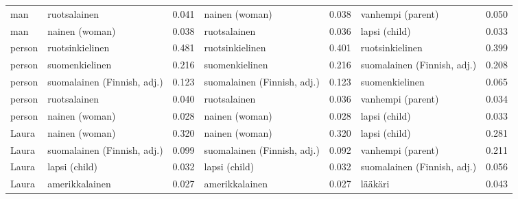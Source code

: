 \begin{longtable}{llrlrlr}
   man &                ruotsalainen &                            0.041 &              nainen (woman) &                                 0.038 &           vanhempi (parent) &                           0.050 \\
   man &              nainen (woman) &                            0.038 &                ruotsalainen &                                 0.036 &               lapsi (child) &                           0.033 \\
person &             ruotsinkielinen &                            0.481 &             ruotsinkielinen &                                 0.401 &             ruotsinkielinen &                           0.399 \\
person &              suomenkielinen &                            0.216 &              suomenkielinen &                                 0.216 & suomalainen (Finnish, adj.) &                           0.208 \\
person & suomalainen (Finnish, adj.) &                            0.123 & suomalainen (Finnish, adj.) &                                 0.123 &              suomenkielinen &                           0.065 \\
person &                ruotsalainen &                            0.040 &                ruotsalainen &                                 0.036 &           vanhempi (parent) &                           0.034 \\
person &              nainen (woman) &                            0.028 &              nainen (woman) &                                 0.028 &               lapsi (child) &                           0.033 \\
 Laura &              nainen (woman) &                            0.320 &              nainen (woman) &                                 0.320 &               lapsi (child) &                           0.281 \\
 Laura & suomalainen (Finnish, adj.) &                            0.099 & suomalainen (Finnish, adj.) &                                 0.092 &           vanhempi (parent) &                           0.211 \\
 Laura &               lapsi (child) &                            0.032 &               lapsi (child) &                                 0.032 & suomalainen (Finnish, adj.) &                           0.056 \\
 Laura &              amerikkalainen &                            0.027 &              amerikkalainen &                                 0.027 &                     lääkäri &                           0.043 \\

\end{longtable}
